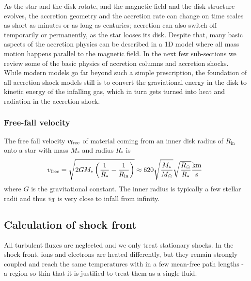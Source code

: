 As the star and the disk rotate, and the magnetic field and the disk structure evolves, the accretion geometry and the accretion rate can change on time scales as short as minutes or as long as centuries; accretion can also switch off temporarily or permanently, as the star looses its disk. Despite that, many basic aspects of the accretion physics can be described in a 1D model where all mass motion happens parallel to the magnetic field. In the next few sub-sections we review some of the basic physics of accretion columns and accretion shocks. While modern models go far beyond such a simple prescription, the foundation of all accretion shock models still is to convert the graviational energy in the disk to kinetic energy of the infalling gas, which in turn gets turned into heat and radiation in the accretion shock.

\subsubsection{Free-fall velocity}
The free fall velocity $v_{\textnormal{free}}$ of material coming from an inner disk radius of $R_\mathrm{in}$ onto a star with mass $M_*$ and radius $R_*$ is
\begin{equation}
v_{\textnormal{free}} = \sqrt{{2GM_*} \left(\frac{1}{R_*} - \frac{1}{R_\mathrm{in}}\right)} \approx 620 \sqrt{\frac{M_*}{M_\odot}}\sqrt{\frac{R_\odot}{R_*}} \frac{\textnormal{km}}{\textnormal{s}}\ \label{eqn:freefall}
\end{equation}
where $G$ is the gravitational constant. The inner radius is typically a few stellar radii and thus $v_\textnormal{ff}$ is very close to infall from infinity.


\subsection{Calculation of shock front}
All turbulent fluxes are neglected and we only treat stationary shocks. In the shock front, ions and electrons are heated differently, but they remain strongly coupled and reach the same temperatures with in a few mean-free path lengths - a region so thin that it is justified to treat them as a single fluid.

